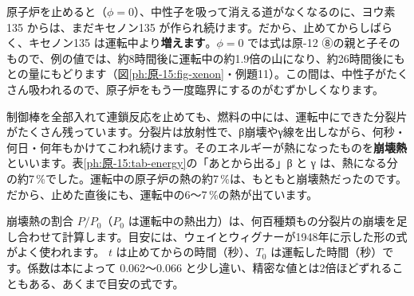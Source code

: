 \noindent\begin{minipage}[c]{0.48\linewidth}\raggedright
原子炉を止めると（$\phi=0$）、中性子を吸って消える道がなくなるのに、ヨウ素135 からは、まだキセノン135 が作られ続けます。だから、止めてからしばらく、キセノン135 は運転中より\textbf{増えます}。$\phi=0$ では式は原-12 ⑧の親と子そのもので、例の値では、約8時間後に運転中の約1.9倍の山になり、約26時間後にもとの量にもどります（図\ref{ph:原-15:fig-xenon}・例題11）。この間は、中性子がたくさん吸われるので、原子炉をもう一度臨界にするのがむずかしくなります。
\end{minipage}\hfill
\begin{minipage}[c]{0.49\linewidth}\centering
{}
\label{ph:原-15:fig-xenon}
\end{minipage}

\label{ph:原-15:sec11}
制御棒を全部入れて連鎖反応を止めても、燃料の中には、運転中にできた分裂片がたくさん残っています。分裂片は放射性で、β崩壊やγ線を出しながら、何秒・何日・何年もかけてこわれ続けます。そのエネルギーが熱になったものを\textbf{崩壊熱}といいます。表\ref{ph:原-15:tab-energy}の「あとから出る」β と γ は、熱になる分の約7\,\%でした。運転中の原子炉の熱の約7\,\%は、もともと崩壊熱だったのです。だから、止めた直後にも、運転中の6〜7\,\%の熱が出ています。

崩壊熱の割合 $P/P_0$（$P_0$ は運転中の熱出力）は、何百種類もの分裂片の崩壊を足し合わせて計算します。目安には、ウェイとウィグナーが1948年に示した形の式がよく使われます。
\label{ph:原-15:decayheat}$t$ は止めてからの時間（秒）、$T_0$ は運転した時間（秒）です。係数は本によって 0.062〜0.066 と少し違い、精密な値とは2倍ほどずれることもある、あくまで目安の式です。

